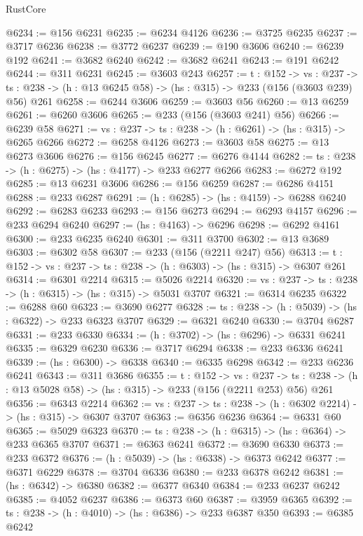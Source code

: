 \begin{lexlean}{RustCore}
\begin{coremodule}
@6234 := @156 @6231
@6235 := @6234 @4126
@6236 := @3725 @6235
@6237 := @3717 @6236
@6238 := @3772 @6237
@6239 := @190 @3606
@6240 := @6239 @192
@6241 := @3682 @6240
@6242 := @3682 @6241
@6243 := @191 @6242
@6244 := @311 @6231
@6245 := @3603 @243
@6257 := {t : @152} ->
  {vs : @237} ->
  {ts : @238} -> (h : @13 @6245 @58) -> (hs : @315) -> @233 (@156 (@3603 @239) @56) @261
@6258 := @6244 @3606
@6259 := @3603 @56
@6260 := @13 @6259
@6261 := @6260 @3606
@6265 := @233 (@156 (@3603 @241) @56)
@6266 := @6239 @58
@6271 := {vs : @237} -> {ts : @238} -> (h : @6261) -> (hs : @315) -> @6265 @6266
@6272 := @6258 @4126
@6273 := @3603 @58
@6275 := @13 @6273 @3606
@6276 := @156 @6245
@6277 := @6276 @4144
@6282 := {ts : @238} -> (h : @6275) -> (hs : @4177) -> @233 @6277 @6266
@6283 := @6272 @192
@6285 := @13 @6231 @3606
@6286 := @156 @6259
@6287 := @6286 @4151
@6288 := @233 @6287
@6291 := (h : @6285) -> (hs : @4159) -> @6288 @6240
@6292 := @6283 @6233
@6293 := @156 @6273
@6294 := @6293 @4157
@6296 := @233 @6294 @6240
@6297 := (hs : @4163) -> @6296
@6298 := @6292 @4161
@6300 := @233 @6235 @6240
@6301 := @311 @3700
@6302 := @13 @3689
@6303 := @6302 @58
@6307 := @233 (@156 (@2211 @247) @56)
@6313 := {t : @152} -> {vs : @237} -> {ts : @238} -> (h : @6303) -> (hs : @315) -> @6307 @261
@6314 := @6301 @2214
@6315 := @5026 @2214
@6320 := {vs : @237} -> {ts : @238} -> (h : @6315) -> (hs : @315) -> @5031 @3707
@6321 := @6314 @6235
@6322 := @6288 @60
@6323 := @3690 @6277
@6328 := {ts : @238} -> (h : @5039) -> (hs : @6322) -> @233 @6323 @3707
@6329 := @6321 @6240
@6330 := @3704 @6287
@6331 := @233 @6330
@6334 := (h : @3702) -> (hs : @6296) -> @6331 @6241
@6335 := @6329 @6230
@6336 := @3717 @6294
@6338 := @233 @6336 @6241
@6339 := (hs : @6300) -> @6338
@6340 := @6335 @6298
@6342 := @233 @6236 @6241
@6343 := @311 @3686
@6355 := {t : @152} ->
  {vs : @237} ->
  {ts : @238} -> (h : @13 @5028 @58) -> (hs : @315) -> @233 (@156 (@2211 @253) @56) @261
@6356 := @6343 @2214
@6362 := {vs : @237} -> {ts : @238} -> (h : @6302 @2214) -> (hs : @315) -> @6307 @3707
@6363 := @6356 @6236
@6364 := @6331 @60
@6365 := @5029 @6323
@6370 := {ts : @238} -> (h : @6315) -> (hs : @6364) -> @233 @6365 @3707
@6371 := @6363 @6241
@6372 := @3690 @6330
@6373 := @233 @6372
@6376 := (h : @5039) -> (hs : @6338) -> @6373 @6242
@6377 := @6371 @6229
@6378 := @3704 @6336
@6380 := @233 @6378 @6242
@6381 := (hs : @6342) -> @6380
@6382 := @6377 @6340
@6384 := @233 @6237 @6242
@6385 := @4052 @6237
@6386 := @6373 @60
@6387 := @3959 @6365
@6392 := {ts : @238} -> (h : @4010) -> (hs : @6386) -> @233 @6387 @350
@6393 := @6385 @6242

\end{coremodule}
\end{lexlean}
